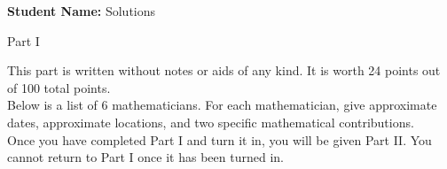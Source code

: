 \documentclass[11pt]{article}
\def\bc{\begin{center}}
\def\ec{\end{center}}
\begin{document}
\thispagestyle{fancy}

\vspace{1in}

\textbf{Student Name:}\hspace{0.5in} Solutions


\vspace*{-0.3in}

\bc Part I \ec

This part is written without notes or aids of any kind. It is worth 24 points out of 100 total points. \\

Below is a list of 6 mathematicians. For each mathematician, give approximate dates, approximate locations, and two specific mathematical contributions. \\

Once you have completed Part I and turn it in, you will be given Part II. You cannot return to Part I once it has been turned in.\\
\end{document}
